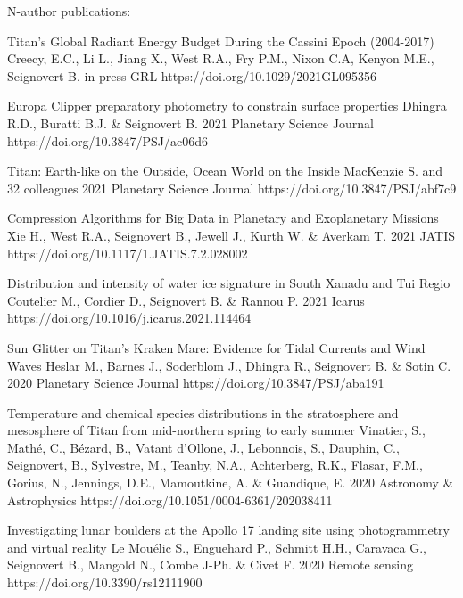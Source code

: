 \begin{cvpublications}{N-author publications:}

	{Titan’s Global Radiant Energy Budget During the Cassini Epoch (2004-2017)}
	{Creecy, E.C., Li L., Jiang X., West R.A., Fry P.M., Nixon C.A, Kenyon M.E., Seignovert B.}
    {in press}
	{GRL}
    {https://doi.org/10.1029/2021GL095356}

	{Europa Clipper preparatory photometry to constrain surface properties}
	{Dhingra R.D., Buratti B.J. \& Seignovert B.}
    {2021}
	{Planetary Science Journal}
    {https://doi.org/10.3847/PSJ/ac06d6}

	{Titan: Earth-like on the Outside, Ocean World on the Inside}
	{MacKenzie S. and 32 colleagues}
    {2021}
	{Planetary Science Journal}
    {https://doi.org/10.3847/PSJ/abf7c9}

	{Compression Algorithms for Big Data in Planetary and Exoplanetary Missions}
	{Xie H., West R.A., Seignovert B., Jewell J., Kurth W. \& Averkam T.}
    {2021}
	{JATIS}
    {https://doi.org/10.1117/1.JATIS.7.2.028002}

	{Distribution and intensity of water ice signature in South Xanadu and Tui Regio}
	{Coutelier M., Cordier D., Seignovert B. \& Rannou P.}
    {2021}
	{Icarus}
    {https://doi.org/10.1016/j.icarus.2021.114464}

	{Sun Glitter on Titan's Kraken Mare: Evidence for Tidal Currents and Wind Waves}
	{Heslar M., Barnes J., Soderblom J., Dhingra R., Seignovert B. \& Sotin C.}
	{2020}
    {Planetary Science Journal}
    {https://doi.org/10.3847/PSJ/aba191}

	{Temperature and chemical species distributions in the stratosphere and mesosphere of Titan from mid-northern spring to early summer}
	{Vinatier, S., Mathé, C., Bézard, B., Vatant d’Ollone, J., Lebonnois, S., Dauphin, C., Seignovert, B., Sylvestre, M., Teanby, N.A., Achterberg, R.K., Flasar, F.M., Gorius, N., Jennings, D.E., Mamoutkine, A. \& Guandique, E.}
    {2020}
	{Astronomy \& Astrophysics}
    {https://doi.org/10.1051/0004-6361/202038411}

	{Investigating lunar boulders at the Apollo 17 landing site using photogrammetry and virtual reality}
	{Le Mouélic S., Enguehard P., Schmitt H.H., Caravaca G., Seignovert B., Mangold N., Combe J-Ph. \& Civet F.}
	{2020}
    {Remote sensing}
    {https://doi.org/10.3390/rs12111900}


\end{cvpublications}
